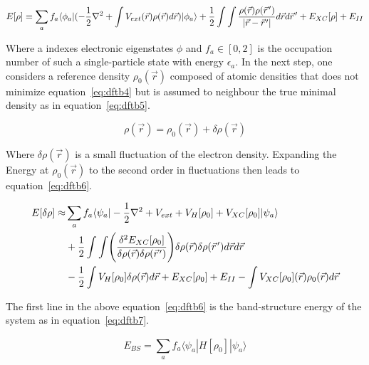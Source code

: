 \documentclass[12pt]{article}
\newcommand{\pvec}[1]{\vec{#1}\mkern2mu\vphantom{#1}}
\begin{document}
\begin{equation}
  E[\rho] = \sum_{a}^{} f_a \langle\phi_a|(-\frac{1}{2}\nabla^2 + \int V_{ext}(\vec{r})\rho(\vec{r})d\vec{r})|\phi_a\rangle + \frac{1}{2}\int\int \frac{\rho(\vec{r})\rho(\pvec{r}')}{|\vec{r}-\pvec{r}'|}d\vec{r}d\pvec{r}' + E_{XC}[\rho] + E_{II}
  \label{eq:dftb4}
\end{equation}

\bigskip

\noindent Where a indexes electronic eigenstates $\phi$ and $f_a \in [0,2]$ is the occupation number of such a single-particle state with energy $\epsilon_a$.
In the next step, one considers a reference density $\rho_0(\vec{r})$ composed of atomic densities that does not minimize equation~\ref{eq:dftb4} but is assumed to neighbour the true minimal density as in equation~\ref{eq:dftb5}.

\begin{equation}
  \rho(\vec{r}) = \rho_0(\vec{r}) + \delta\rho(\vec{r})
  \label{eq:dftb5}
\end{equation}

\bigskip

\noindent Where $\delta\rho(\vec{r})$ is a small fluctuation of the electron density. Expanding the Energy at $\rho_0(\vec{r})$ to the second order in fluctuations then leads to equation~\ref{eq:dftb6}.

\begin{align}\label{eq:dftb6}
    E[\delta\rho] \approx &\sum_{a}^{} f_a \langle\psi_a|-\frac{1}{2}\nabla^2+V_{ext} + V_H[\rho_0] + V_{XC}[\rho_0]|\psi_a\rangle \\
    &+ \frac{1}{2}\int\int \Biggl(\frac{\delta^2E_{XC}[\rho_0]}{\delta\rho(\vec{r})\delta\rho(\pvec{r}')}\Biggr)\delta\rho(\vec{r})\delta\rho(\pvec{r}')d\vec{r}d\pvec{r} \notag \\
    &-\frac{1}{2}\int V_H[\rho_0]\delta\rho(\vec{r})d\vec{r} + E_{XC}[\rho_0] + E_{II} - \int V_{XC}[\rho_0](\vec{r})\rho_0(\vec{r})d\vec{r} \notag
\end{align}

\bigskip

\noindent The first line in the above equation~\ref{eq:dftb6} is the band-structure energy of the system as in equation~\ref{eq:dftb7}.

\begin{equation}
  E_{BS} = \sum_{a}^{} f_a \langle\psi_a|H[\rho_0]|\psi_a\rangle
  \label{eq:dftb7}
\end{equation}

\bigskip
\end{document}
